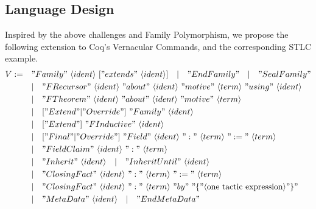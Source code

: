 
\subsection{Language Design}

Inspired by the above challenges and Family Polymorphism, we propose
the following extension to Coq's Vernacular Commands, and the corresponding STLC example.
\begin{align*}
  V := \quad &"Family"~\langle ident\rangle~["extends"~\langle ident\rangle] 
  \quad |\quad "EndFamily" \quad | \quad "SealFamily" \\
  & |\quad "FRecursor"~\langle ident\rangle~"about"~\langle ident\rangle~"motive"~\langle term\rangle~"using"~\langle ident\rangle \\
  & | \quad "FTheorem"~\langle ident\rangle~"about"~\langle ident\rangle~"motive"~\langle term\rangle \\
  & |\quad ["Extend" | "Override"]~"Family"~\langle ident\rangle \\ 
  & |\quad ["Extend"]~"FInductive"~\langle ident\rangle \\ 
  & |\quad ["Final" | "Override"]~"Field"~\langle ident\rangle~":"~\langle term \rangle~":="~\langle term \rangle \\
  & | \quad "FieldClaim"~\langle ident\rangle~":"~\langle term \rangle \\
  & | \quad "Inherit"~\langle ident\rangle \quad | \quad "Inherit Until"~\langle ident\rangle \quad \\
  & | \quad "Closing Fact"~\langle ident\rangle~":"~\langle term \rangle~":="~\langle term \rangle \\ 
  & | \quad "Closing Fact"~\langle ident\rangle~":"~\langle term \rangle~"by"~"\{"\langle \text{one tactic expression}\rangle"\}" \\ 
  & | \quad "MetaData"~\langle ident\rangle \quad | \quad "EndMetaData" \\ 
\end{align*}


